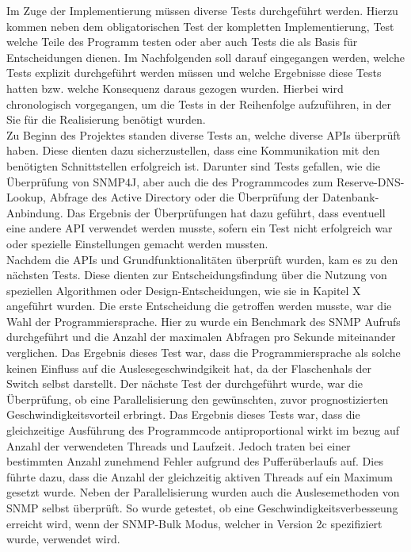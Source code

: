 Im Zuge der Implementierung müssen diverse Tests durchgeführt werden. Hierzu kommen neben dem obligatorischen Test der kompletten Implementierung, Test welche Teile des Programm testen oder aber auch Tests die als Basis für Entscheidungen dienen.
Im Nachfolgenden soll darauf eingegangen werden, welche Tests explizit durchgeführt werden müssen und welche Ergebnisse diese Tests hatten bzw. welche Konsequenz daraus gezogen wurden. Hierbei wird chronologisch vorgegangen, um die Tests in der Reihenfolge aufzuführen, in der Sie für die Realisierung benötigt wurden.\\
Zu Beginn des Projektes standen diverse Tests an, welche diverse APIs überprüft haben. Diese dienten dazu sicherzustellen, dass eine Kommunikation mit den benötigten Schnittstellen erfolgreich ist. Darunter sind Tests gefallen, wie die Überprüfung von SNMP4J, aber auch die des Programmcodes zum Reserve-DNS-Lookup, Abfrage des Active Directory oder die  Überprüfung der Datenbank-Anbindung. Das Ergebnis der Überprüfungen hat dazu geführt, dass eventuell eine andere API verwendet werden musste, sofern ein Test nicht erfolgreich war oder spezielle Einstellungen gemacht werden mussten.\\
Nachdem die APIs und Grundfunktionalitäten überprüft wurden, kam es zu den nächsten Tests. Diese dienten zur Entscheidungsfindung über die Nutzung von speziellen Algorithmen oder Design-Entscheidungen, wie sie in Kapitel X angeführt wurden.
Die erste Entscheidung die getroffen werden musste, war die Wahl der Programmiersprache. Hier zu wurde ein Benchmark des SNMP Aufrufs durchgeführt und die Anzahl der maximalen  Abfragen pro Sekunde miteinander verglichen. Das Ergebnis dieses Test war, dass die Programmiersprache als solche keinen Einfluss auf die Auslesegeschwindgikeit hat, da der Flaschenhals der Switch selbst darstellt. Der nächste Test der durchgeführt wurde, war die Überprüfung, ob eine Parallelisierung den gewünschten, zuvor prognostizierten Geschwindigkeitsvorteil erbringt. Das Ergebnis dieses Tests war, dass die gleichzeitige Ausführung des Programmcode antiproportional wirkt im bezug auf Anzahl der verwendeten Threads und Laufzeit. Jedoch traten bei einer bestimmten Anzahl zunehmend Fehler aufgrund des Pufferüberlaufs auf. Dies führte dazu, dass die Anzahl der gleichzeitig aktiven Threads auf ein Maximum gesetzt wurde. Neben der Parallelisierung wurden auch die Auslesemethoden von SNMP selbst überprüft. So wurde getestet, ob eine Geschwindigkeitsverbesseung erreicht wird, wenn der SNMP-Bulk Modus, welcher in Version 2c spezifiziert wurde, verwendet wird.

